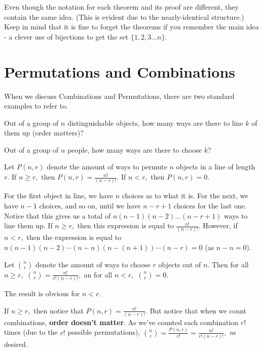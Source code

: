 \documentclass[blue,onecol]{shooting}
\begin{document}
Even though the notation for each theorem and its proof are different, they contain the same idea. (This is evident due to the nearly-identical structure.) Keep in mind that it is fine to forget the theorems if you remember the main idea - a clever use of bijections to get the set $\{1,2,3\dots n\}.$

\section{Permutations and Combinations}

When we discuss Combinations and Permutations, there are two standard examples to refer to.

\begin{exam}[Permutations]
Out of a group of $n$ distinguishable objects, how many ways are there to line $k$ of them up (order matters)?
\end{exam}

\begin{exam}[Combinations]
Out of a group of $n$ people, how many ways are there to choose $k?$
\end{exam}

\begin{theo}[Permutations]
Let $P(n,r)$ denote the amount of ways to permute $n$ objects in a line of length $r.$ If $n\geq r,$ then $P(n,r)=\frac{n!}{(n-r)!}.$ If $n<r,$ then $P(n,r)=0.$
\end{theo}

\begin{pro}
For the first object in line, we have $n$ choices as to what it is. For the next, we have $n-1$ choices, and so on, until we have $n-r+1$ choices for the last one. Notice that this gives us a total of $n(n-1)(n-2)\dots(n-r+1)$ ways to line them up. If $n\geq r,$ then this expression is equal to $\frac{n!}{(n-r)!}.$ However, if $n<r,$ then the expression is equal to $n(n-1)(n-2)\cdots(n-n)(n-(n+1))\cdots(n-r)=0$ (as $n-n=0$).
\end{pro}

\begin{theo}[Combinations]
Let $\binom{n}{r}$ denote the amount of ways to choose $r$ objects out of $n.$ Then for all $n\geq r,$ $\binom{n}{r}=\frac{n!}{r!(n-r)!},$ an for all $n<r,$ $\binom{n}{r}=0.$
\end{theo}

\begin{pro}
The result is obvious for $n<r.$

If $n\geq r,$ then notice that $P(n,r)=\frac{n!}{(n-r)!}.$ But notice that when we count combinations, \textbf{order doesn't matter}. As we've counted each combination $r!$ times (due to the $r!$ possible permutations), $\binom{n}{r}=\frac{P(n,r)}{r!}=\frac{n!}{r!(n-r)!},$ as desired.
\end{pro}
\end{document}
